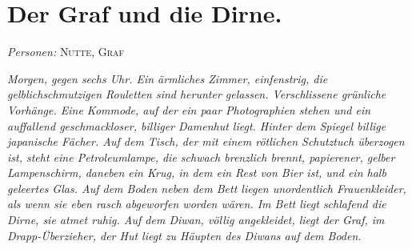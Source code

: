 \documentclass[
	final,
	a4paper,
	ngerman,
	mpinclude = true, %
	twoside = true,
	open = right,
	cleardoublepage = plain,
	DIV = 13,
	BCOR = 1cm,
	titlepage = firstiscover,
	]{scrbook}
\newcommand{\scene}{\section}
\newcommand{\setting}[1]{\vspace{-0.5\baselineskip}\centering\textit{#1}}
\newcommand{\characterlist}[1]{{\begin{center}\textit{Personen:} #1\end{center}}}
\newcommand{\thecharacter}[1]{\textup{\textsc{#1}}\xspace}
\newcommand{\thedirne}{\thecharacter{Nutte}}
\newcommand{\thegraf}{\thecharacter{Graf}}
\begin{document}
\scene{Der Graf und die Dirne.}
\characterlist{\thedirne, \thegraf}
\setting{Morgen, gegen sechs Uhr. Ein ärmliches Zimmer, einfenstrig, die gelblichschmutzigen Rouletten sind herunter gelassen. Verschlissene grünliche Vorhänge. Eine Kommode, auf der ein paar Photographien stehen und ein auffallend geschmackloser, billiger Damenhut liegt. Hinter dem Spiegel billige japanische Fächer. Auf dem Tisch, der mit einem rötlichen Schutztuch überzogen ist, steht eine Petroleumlampe, die schwach brenzlich brennt, papierener, gelber Lampenschirm, daneben ein Krug, in dem ein Rest von Bier ist, und ein halb geleertes Glas. Auf dem Boden neben dem Bett liegen unordentlich Frauenkleider, als wenn sie eben rasch abgeworfen worden wären. Im Bett liegt schlafend die Dirne, sie atmet ruhig. Auf dem Diwan, völlig angekleidet, liegt der Graf, im Drapp-Überzieher, der Hut liegt zu Häupten des Diwans auf dem Boden.}
\end{document}
